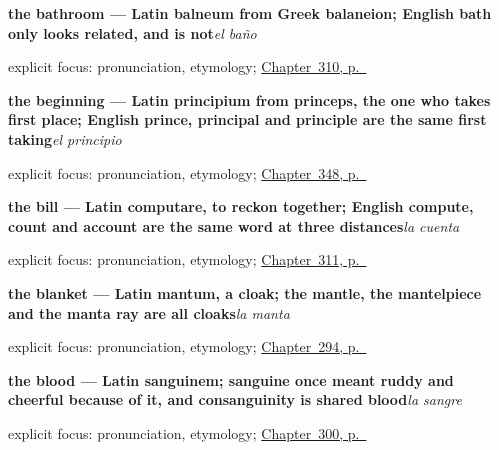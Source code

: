 \noindent\begin{minipage}[t]{\linewidth}
\raggedright
\textbf{the bathroom — Latin balneum from Greek balaneion; English bath only looks related, and is not}\enspace\emph{el baño}\par
\footnotesize explicit focus: pronunciation, etymology; \hyperref[ch:el-cuarto-y-la-mesa]{Chapter~310, p.~\pageref*{ch:el-cuarto-y-la-mesa}}
\end{minipage}\par\smallskip

\noindent\begin{minipage}[t]{\linewidth}
\raggedright
\textbf{the beginning — Latin principium from princeps, the one who takes first place; English prince, principal and principle are the same first taking}\enspace\emph{el principio}\par
\footnotesize explicit focus: pronunciation, etymology; \hyperref[ch:el-principio-y-el-fin]{Chapter~348, p.~\pageref*{ch:el-principio-y-el-fin}}
\end{minipage}\par\smallskip

\noindent\begin{minipage}[t]{\linewidth}
\raggedright
\textbf{the bill — Latin computare, to reckon together; English compute, count and account are the same word at three distances}\enspace\emph{la cuenta}\par
\footnotesize explicit focus: pronunciation, etymology; \hyperref[ch:la-tienda-y-la-cuenta]{Chapter~311, p.~\pageref*{ch:la-tienda-y-la-cuenta}}
\end{minipage}\par\smallskip

\noindent\begin{minipage}[t]{\linewidth}
\raggedright
\textbf{the blanket — Latin mantum, a cloak; the mantle, the mantelpiece and the manta ray are all cloaks}\enspace\emph{la manta}\par
\footnotesize explicit focus: pronunciation, etymology; \hyperref[ch:cinco-cosas-mas]{Chapter~294, p.~\pageref*{ch:cinco-cosas-mas}}
\end{minipage}\par\smallskip

\noindent\begin{minipage}[t]{\linewidth}
\raggedright
\textbf{the blood — Latin sanguinem; sanguine once meant ruddy and cheerful because of it, and consanguinity is shared blood}\enspace\emph{la sangre}\par
\footnotesize explicit focus: pronunciation, etymology; \hyperref[ch:el-cuerpo-dice]{Chapter~300, p.~\pageref*{ch:el-cuerpo-dice}}
\end{minipage}\par\smallskip

